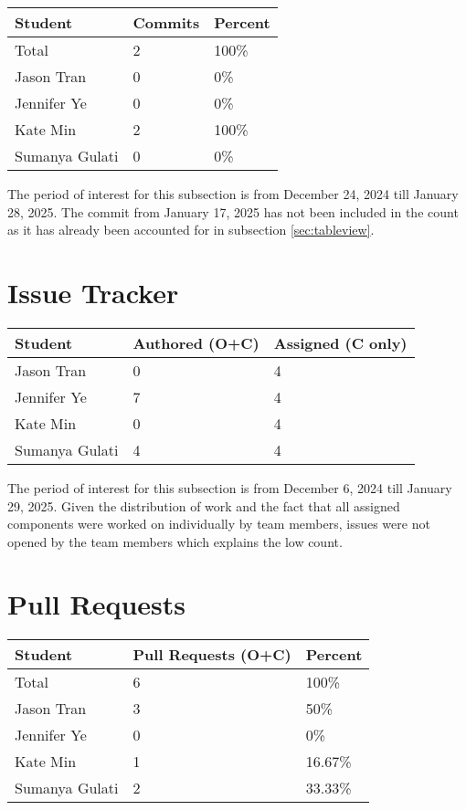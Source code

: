 \documentclass{article}
\begin{document}
\begin{table}[H]
\centering
\begin{tabular}{lll}
\toprule
\textbf{Student} & \textbf{Commits} & \textbf{Percent}\\
\midrule
Total & 2 & 100\% \\
Jason Tran & 0 & 0\% \\
Jennifer Ye & 0 & 0\% \\
Kate Min & 2 & 100\% \\
Sumanya Gulati & 0 & 0\% \\
\bottomrule
\end{tabular}
\end{table}

The period of interest for this subsection is from December 24, 2024 till January 28, 2025. The commit 
from January 17, 2025 has not been included in the count as it has already been 
accounted for in subsection \ref{sec:tableview}. 

\section{Issue Tracker}

\begin{table}[H]
\centering
\begin{tabular}{lll}
\toprule
\textbf{Student} & \textbf{Authored (O+C)} & \textbf{Assigned (C only)}\\
\midrule
Jason Tran & 0 & 4 \\
Jennifer Ye & 7 & 4 \\
Kate Min & 0 & 4 \\
Sumanya Gulati & 4 & 4 \\
\bottomrule
\end{tabular}
\end{table}

The period of interest for this subsection is from December 6, 2024 till January 29, 2025.
Given the distribution of work and the fact that all assigned components were worked on 
individually by team members, issues were not opened by the team members which explains the 
low count.

\section{Pull Requests}

\begin{table}[H]
\centering
\begin{tabular}{lll}
\toprule
\textbf{Student} & \textbf{Pull Requests (O+C)} & \textbf{Percent}\\
\midrule
Total & 6 & 100\% \\
Jason Tran & 3 & 50\% \\
Jennifer Ye & 0 & 0\% \\
Kate Min & 1 & 16.67\% \\
Sumanya Gulati & 2 & 33.33\% \\
\bottomrule
\end{tabular}
\end{table}
\end{document}
